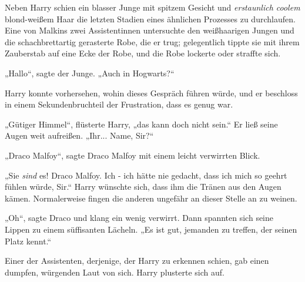 Neben Harry schien ein blasser Junge mit spitzem Gesicht und \emph{erstaunlich coolem} blond-weißem Haar die letzten Stadien eines ähnlichen Prozesses zu durchlaufen. Eine von Malkins zwei Assistentinnen untersuchte den weißhaarigen Jungen und die schachbrettartig gerasterte Robe, die er trug; gelegentlich tippte sie mit ihrem Zauberstab auf eine Ecke der Robe, und die Robe lockerte oder straffte sich.

„Hallo“, sagte der Junge. „Auch in Hogwarts?“

Harry konnte vorhersehen, wohin dieses Gespräch führen würde, und er beschloss in einem Sekundenbruchteil der Frustration, dass es genug war.

„Gütiger Himmel“, flüsterte Harry, „das kann doch nicht sein.“ Er ließ seine Augen weit aufreißen. „Ihr... Name, Sir?“ 

„Draco Malfoy“, sagte Draco Malfoy mit einem leicht verwirrten Blick.

„Sie \emph{sind} es! Draco Malfoy. Ich - ich hätte nie gedacht, dass ich mich so geehrt fühlen würde, Sir.“ Harry wünschte sich, dass ihm die Tränen aus den Augen kämen. Normalerweise fingen die anderen ungefähr an dieser Stelle an zu weinen.

„Oh“, sagte Draco und klang ein wenig verwirrt. Dann spannten sich seine Lippen zu einem süffisanten Lächeln. „Es ist gut, jemanden zu treffen, der seinen Platz kennt.“

Einer der Assistenten, derjenige, der Harry zu erkennen schien, gab einen dumpfen, würgenden Laut von sich. Harry plusterte sich auf.

